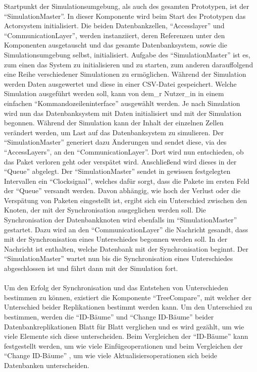 \documentclass[a4paper,11pt,oneside,%
headsepline,												%
footsepline,												%
bibtotocnumbered									%
]{scrreprt}
\begin{document}
Startpunkt der Simulationsumgebung, als auch des gesamten Prototypen, ist der \enquote{SimulationMaster}. In dieser Komponente wird beim Start des Prototypen das Actorsystem initialisiert. Die beiden Datenbankzellen, \enquote{Accesslayer} und \enquote{CommunicationLayer}, werden instanziiert, deren Referenzen unter den Komponenten ausgetauscht und das gesamte Datenbanksystem, sowie die Simulationsumgebung selbst, initialisiert. Aufgabe des \enquote{SimulationMaster} ist es, zum einen das System zu initialisieren und zu starten, zum anderen darauffolgend eine Reihe verschiedener Simulationen zu ermöglichen. Während der Simulation werden Daten ausgewertet und diese in einer CSV-Datei gespeichert. Welche Simulation ausgeführt werden soll, kann von dem\_r Nutzer\_in  in einem einfachen \enquote{Kommandozeileninterface} ausgewählt werden. Je nach Simulation wird nun das Datenbanksystem mit Daten initialisiert und mit der Simulation begonnen. Während der Simulation kann der Inhalt der einzelnen Zellen verändert werden, um Last auf das Datenbanksystem zu simulieren. Der \enquote{SimulationMaster} generiert dazu Änderungen und sendet diese, via des \enquote{AccessLayers}, an den \enquote{CommunicationLayer}. Dort wird nun entschieden, ob das Paket verloren geht oder verspätet wird. Anschließend wird dieses in der \enquote{Queue} abgelegt. Der \enquote{SimulationMaster} sendet in gewissen festgelegten Intervallen ein \enquote{Clocksignal}, welches dafür sorgt, dass die Pakete im ersten Feld der \enquote{Queue} versandt werden. Davon abhängig, wie hoch der Verlust oder die Verspätung von Paketen eingestellt ist, ergibt sich ein Unterschied zwischen den Knoten, der mit der Synchronisation ausgeglichen werden soll. Die Synchronisation der Datenbankknoten wird ebenfalls im \enquote{SimulationMaster} gestartet. Dazu wird an den \enquote{CommunicationLayer} die Nachricht gesandt, dass mit der Synchronisation eines Unterschiedes begonnen werden soll. In der Nachricht ist enthalten, welche Datenbank mit der Synchronisation beginnt. Der \enquote{SimulationMaster} wartet nun bis die Synchronisation eines Unterschiedes abgeschlossen ist und fährt dann mit der Simulation fort.\\\\

Um den Erfolg der Synchronisation und das Entstehen von Unterschieden bestimmen zu können, existiert die Komponente \enquote{TreeCompare}, mit welcher der Unterschied beider Replikationen bestimmt werden kann. Um den Unterschied zu bestimmen, werden die \enquote{ID-Bäume} und \enquote{Change ID-Bäume} beider Datenbankreplikationen Blatt für Blatt verglichen und es wird gezählt, um wie viele Elemente sich diese unterscheiden. Beim Vergleichen der \enquote{ID-Bäume} kann festgestellt werden, um wie viele Einfügeoperationen und beim Vergleichen der \enquote{Change ID-Bäume} , um wie viele Aktualisiersoperationen sich beide Datenbanken unterscheiden.
\end{document}
